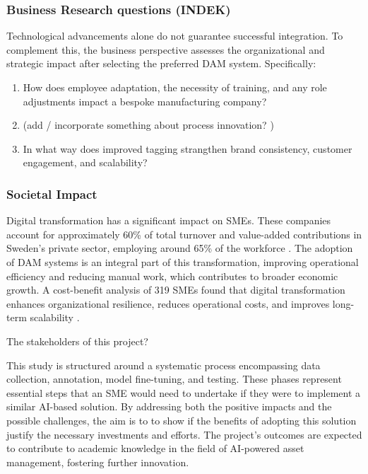 \documentclass[a4paper,10pt,twocolumn]{article}
\numberwithin{figure}{section}
\numberwithin{table}{section}
\begin{document}
\subsubsection{Business Research questions (INDEK)}
\vspace{0.3cm}
Technological advancements alone do not guarantee successful integration. To complement this,
the business perspective assesses the organizational and strategic impact after selecting the preferred DAM system. Specifically:

\begin{enumerate}[label=(\alph*), resume]
    \item How does employee adaptation, the necessity of training, and any role adjustments impact a bespoke manufacturing company? 
    \item (add / incorporate something about process innovation? )
    \item In what way does improved tagging strangthen brand consistency, customer engagement, and scalability?
\end{enumerate}   

\subsubsection{Societal Impact}
\vspace{0.2cm}
Digital transformation has a significant impact on SMEs.
These companies account for approximately 60\% of total turnover and value-added 
contributions in Sweden’s private sector, employing around 65\% of the 
workforce \citep{tillvaxtverket2021}.
The adoption of DAM systems is an integral part of this transformation, 
improving operational efficiency and reducing manual work,
which contributes to broader economic growth. A cost-benefit analysis of 319 SMEs 
found that digital transformation enhances organizational resilience, reduces 
operational costs, and improves long-term scalability \citep{teng2022}.

\vspace{0.3cm}
The stakeholders of this project?

This study is structured around a systematic process 
encompassing data collection, annotation, model fine-tuning, and testing. 
These phases represent essential steps that an SME would need to undertake 
if they were to implement a similar AI-based solution. 
By addressing both the positive impacts and the possible challenges, the aim is to
to show if the benefits of adopting this solution
justify the necessary investments and efforts.
The project’s outcomes are expected to contribute to 
academic knowledge in the field of AI-powered asset management, 
fostering further innovation. 
\end{document}
